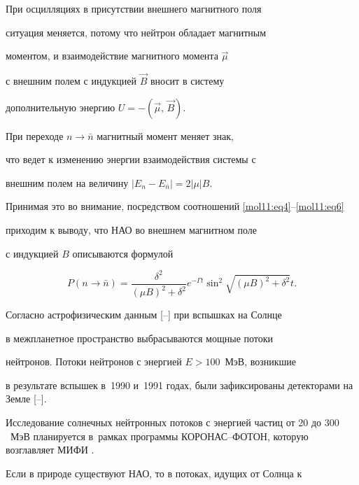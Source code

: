  При осцилляциях в присутствии внешнего магнитного поля

 ситуация меняется, потому что нейтрон обладает магнитным

 моментом, и взаимодействие магнитного момента $\vec \mu$

с внешним  полем с индукцией $\vec B$  вносит в систему

дополнительную энергию  $U = - (\vec \mu,\, \vec B).$

При переходе $n \to \bar  n$ магнитный момент меняет знак,

что ведет к изменению энергии взаимодействия системы с

внешним полем на величину $|E_n - E_{\bar  n}| = 2 |\mu| B$.



Принимая это во внимание, посредством соотношений \eqref{mol11:eq4}--\eqref{mol11:eq6}

приходим к выводу, что НАО во внешнем магнитном поле

с индукцией $B$ описываются формулой

  \begin{equation}

  \label{mol11:eq8}

 P(n \to \bar  n) = \frac{\delta^2}{(\mu B)^2 + \delta^2} e^{-\Gamma t}

   \sin^2 \sqrt{(\mu B)^2 + \delta^2} t.

 \end{equation}



\smallskip


Согласно астрофизическим данным [--] при вспышках на Солнце

в межпланетное пространство выбрасываются мощные потоки

нейтронов. Потоки нейтронов с энергией $E  >  100$~МэВ, возникшие

в результате вспышек в~1990 и~1991 годах, были зафиксированы детекторами на Земле [--]. 

Исследование солнечных нейтронных потоков с энергией частиц от 20 до $300$~МэВ планируется в~рамках  программы КОРОНАС--ФОТОН, которую возглавляет МИФИ \cite{mol8}.



Если в природе существуют НАО, то в потоках, идущих от Солнца к

